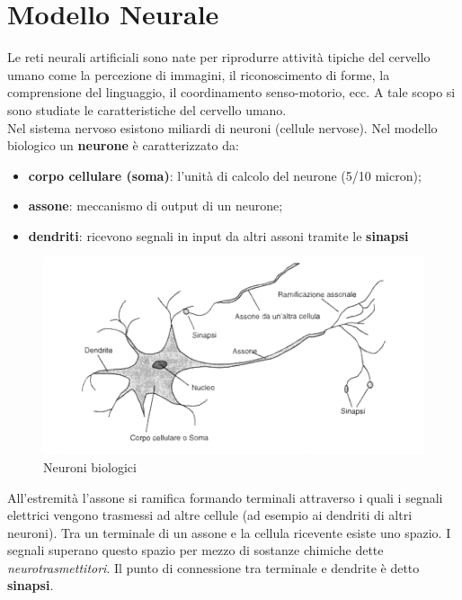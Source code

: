 
\chapter{Modello Neurale} %
\label{cha:modello_neurale}
Le reti neurali artificiali sono nate per riprodurre attività tipiche del cervello umano come la percezione di immagini, il riconoscimento di forme, la comprensione del linguaggio, il coordinamento senso-motorio, ecc. A tale scopo si sono studiate le caratteristiche del cervello umano.\\									

Nel sistema nervoso esistono miliardi di neuroni (cellule nervose).
Nel modello biologico un \textbf{neurone} è caratterizzato da:
\begin{itemize}
    \item \textbf{corpo cellulare (soma)}: l'unità di calcolo del neurone (5/10 micron);
    \item \textbf{assone}: meccanismo di output di un neurone;
    \item \textbf{dendriti}: ricevono segnali in input da altri assoni tramite le \textbf{sinapsi}
\end{itemize}

\begin{figure}[h!]
    \centering
    \includegraphics[width=\textwidth]{images/neuron.png}
    \caption{Neuroni biologici}\label{fig:neuron}
\end{figure}

All’estremità l'assone si ramifica formando terminali attraverso i quali i segnali elettrici vengono trasmessi ad altre cellule (ad esempio ai dendriti di altri neuroni). Tra un terminale di un assone e la cellula ricevente esiste uno spazio. I segnali superano questo spazio per mezzo di sostanze chimiche dette \emph{neurotrasmettitori}. Il punto di connessione tra terminale e dendrite è detto \textbf{sinapsi}.

